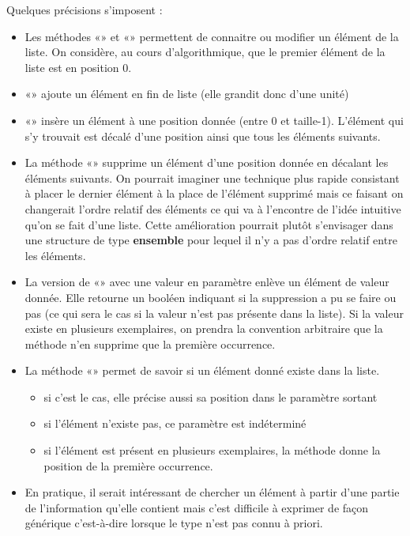 		Quelques précisions s’imposent :
		\begin{itemize}
			\item 
				Les méthodes «» et «»
				permettent de connaitre ou modifier un élément de la liste. On
				considère, au cours d'algorithmique, que le premier élément de 
				la liste est en position 0.
			\item 
				«» ajoute un élément en fin de liste (elle
				grandit donc d’une unité)
			\item 
				«» insère un élément à une position donnée
				(entre 0 et taille-1). L’élément qui s’y trouvait est décalé
				d'une position ainsi que tous les éléments suivants.
			\item 
				La méthode «»
				supprime un élément d'une position donnée en
				décalant les éléments suivants. On pourrait imaginer une technique plus
				rapide consistant à placer le dernier élément à la place de l’élément
				supprimé mais ce faisant on changerait l’ordre relatif des éléments ce
				qui va à l’encontre de l’idée intuitive qu’on se fait d’une liste.
				Cette amélioration pourrait plutôt s’envisager dans une structure de
				type \textbf{ensemble} pour lequel il n’y a pas d’ordre relatif entre
				les éléments.
			\item 
				La version de «» avec une valeur en
				paramètre enlève un élément de valeur donnée. Elle retourne un booléen
				indiquant si la suppression a pu se faire ou pas (ce qui sera le cas si
				la valeur n’est pas présente dans la liste). Si la valeur existe en
				plusieurs exemplaires, on prendra la convention arbitraire que
				la méthode n’en supprime que la première	occurrence.
			\item 
				La méthode «» permet de savoir si un élément
				donné existe dans la liste. 
				\begin{itemize}
					\item 
						si c’est le cas, elle précise aussi sa position dans le paramètre sortant 
					\item 
						si l’élément n’existe pas, ce paramètre est	indéterminé 
					\item 
						si l’élément est présent en plusieurs exemplaires, la méthode donne la
						position de la première occurrence.
				\end{itemize}
			\item 
				En pratique, il serait intéressant de chercher un élément à partir d’une
				partie de l’information qu’elle contient mais c’est difficile à
				exprimer de façon générique c'est-à-dire lorsque le
				type n'est pas connu à priori.
		\end{itemize}
		
